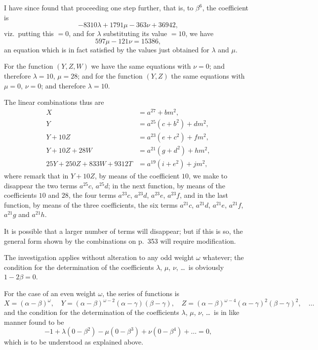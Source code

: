 \documentclass[11pt,a4paper]{article}
\theoremstyle{definition}
\begin{document}
I have since found that proceeding one step further, that is, to $\beta^6$, the coefficient is
\[
-8310\lambda + 1791\mu - 363\nu + 36942,
\]
viz.\ putting this $= 0$, and for $\lambda$ substituting its value $= 10$, we have
\[
597\mu - 121\nu = 15386,
\]
an equation which is in fact satisfied by the values just obtained for $\lambda$ and $\mu$.

For the function $(Y, Z, W)$ we have the same equations with $\nu = 0$; and therefore $\lambda = 10$, $\mu = 28$; and for the function $(Y, Z)$ the same equations with $\mu = 0$, $\nu = 0$; and therefore $\lambda = 10$.

The linear combinations thus are
\begin{align*}
X &= a^{27} + bm^2,\\
Y &= a^{25}(c + b^2) + dm^2,\\
Y + 10Z &= a^{23}(e + c^2) + fm^2,\\
Y + 10Z + 28W &= a^{21}(g + d^2) + hm^2,\\
25Y + 250Z + 833W + 9312T &= a^{19}(i + e^2) + jm^2,
\end{align*}
where remark that in $Y + 10Z$, by means of the coefficient $10$, we make to disappear the two terms $a^{25}c$, $a^{25}d$; in the next function, by means of the coefficients $10$ and $28$, the four terms $a^{23}c$, $a^{23}d$, $a^{23}e$, $a^{23}f$, and in the last function, by means of the three coefficients, the six terms $a^{21}c$, $a^{21}d$, $a^{21}e$, $a^{21}f$, $a^{21}g$ and $a^{21}h$.

It is possible that a larger number of terms will disappear; but if this is so, the general form shown by the combinations on p.~353 will require modification.

The investigation applies without alteration to any odd weight $\omega$ whatever; the condition for the determination of the coefficients $\lambda$, $\mu$, $\nu$, \ldots\ is obviously $1 - 2\beta = 0$.

For the case of an even weight $\omega$, the series of functions is
\[
X = (\alpha - \beta)^{\omega}, \quad Y = (\alpha - \beta)^{\omega-2}(\alpha - \gamma)(\beta - \gamma), \quad Z = (\alpha - \beta)^{\omega-4}(\alpha - \gamma)^2(\beta - \gamma)^2, \quad \ldots
\]
and the condition for the determination of the coefficients $\lambda$, $\mu$, $\nu$, \ldots\ is in like manner found to be
\[
-1 + \lambda(0 - \beta^2) - \mu(0 - \beta^3) + \nu(0 - \beta^4) + \ldots = 0,
\]
which is to be understood as explained above.

\newpage
\end{document}
